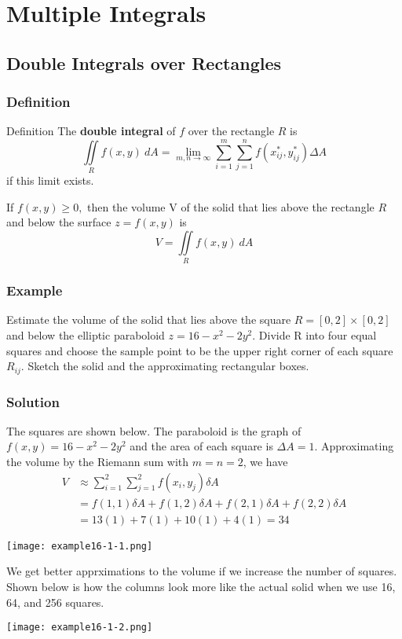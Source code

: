 \chapter{Multiple Integrals}

\section{Double Integrals over Rectangles}

\subsection*{Definition}
Definition The \textbf{double integral} of $f$ over the rectangle $R$ is
$$\iint\limits_R f(x,y)\:dA=\lim_{m,n\to\infty}\sum_{i=1}^m\sum_{j=1}^n f(x_{ij}^*,y_{ij}^*) \Delta A$$
if this limit exists.

If $f(x, y) \geq 0,$ then the volume V of the solid that lies above the rectangle $R$ and
below the surface $z = f(x, y)$ is
$$V=\iint\limits_R f(x,y)\:dA$$

\subsection*{Example}
Estimate the volume of the solid that lies above the square $R=[0,2]\times[0,2]$
and below the elliptic paraboloid $z=16-x^2-2y^2$. Divide R into four equal squares
and choose the sample point to be the upper right corner of each square $R_{ij}$.
Sketch the solid and the approximating rectangular boxes.

\subsection*{Solution}
The squares are shown below. The paraboloid is the graph of
$f(x,y)=16-x^2-2y^2$ and the area of each square is $\Delta A=1$. Approximating
the volume by the Riemann sum with $m=n=2$, we have
\begin{align*}
    V & \approx\sum_{i=1}^2\sum_{j=1}^2 f(x_i,y_j) \delta A          \\
      & =f(1,1)\delta A+f(1,2)\delta A+f(2,1)\delta A+f(2,2)\delta A \\
      & =13(1)+7(1)+10(1)+4(1)=34
\end{align*}
\begin{center}
    \texttt{[image: example16-1-1.png]}
\end{center}

We get better apprximations to the volume if we increase the number of squares.
Shown below is how the columns look more like the actual solid when we use 16, 64, and 256 squares.
\begin{center}
    \texttt{[image: example16-1-2.png]}
\end{center}

